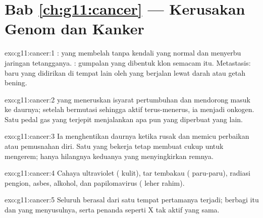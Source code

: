 \section*{Bab \ref{ch:g11:cancer} --- Kerusakan Genom dan Kanker}

\begin{solution}{exo:g11:cancer:1}
:  yang membelah tanpa kendali yang normal dan menyerbu
jaringan tetangganya. : gumpalan yang dibentuk klon semacam itu.
Metastasis:  baru yang didirikan di tempat lain oleh  yang
berjalan lewat darah atau getah bening.
\end{solution}

\begin{solution}{exo:g11:cancer:2}
 yang  meneruskan isyarat pertumbuhan dan mendorong 
masuk ke daurnya; setelah bermutasi sehingga  aktif
terus-menerus, ia menjadi onkogen. Satu pedal gas yang terjepit
menjalankan  apa pun yang diperbuat  yang lain.
\end{solution}

\begin{solution}{exo:g11:cancer:3}
Ia menghentikan daurnya ketika  rusak dan memicu perbaikan atau
pemusnahan diri. Satu  yang bekerja tetap membuat cukup 
untuk mengerem; hanya hilangnya keduanya yang menyingkirkan remnya.
\end{solution}

\begin{solution}{exo:g11:cancer:4}
Cahaya ultraviolet ( kulit), tar tembakau ( paru-paru),
radiasi pengion, asbes, alkohol, dan papilomavirus ( leher rahim).
\end{solution}

\begin{solution}{exo:g11:cancer:5}
Seluruh  berasal dari satu  tempat  pertamanya terjadi;
 berbagi  itu dan  yang menyusulnya, serta penanda
seperti  X tak aktif yang sama.
\end{solution}

